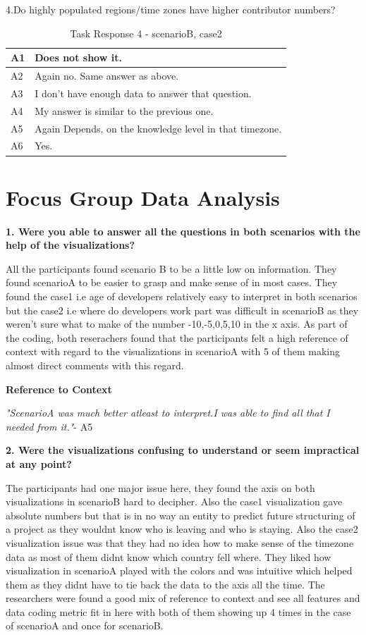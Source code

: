 \documentclass[seploa]{beavtex}
\begin{document}
4.Do highly populated regions/time zones have higher contributor numbers?

\begin{table}[H]
\begin{tabular}{ |p{2cm}|p{12cm}| }
 \hline
 A1 & Does not show it.\\
 \hline
 A2 & Again no. Same answer as above.
\\ \hline
 A3 & I don't have enough data to answer that question.\\ \hline
 A4 & My answer is similar to the previous one.\\ \hline
 A5 & Again Depends, on the knowledge level in that timezone.\\ \hline
 A6 & Yes.\\
 \hline
\end{tabular}
\caption{Task Response 4 - scenarioB, case2}
\label{tab:table34}
\end{table}


\section{Focus Group Data Analysis}
\textbf{1. Were you able to answer all the questions in both scenarios with the help of the visualizations?}

All the participants found scenario B to be a little low on information. They found scenarioA to be easier to grasp and make sense of in most cases. They found the case1 i.e age of developers relatively easy to interpret in both scenarios but the case2 i.e where do developers work part was difficult in scenarioB as they weren't sure what to make of the number -10,-5,0,5,10 in the x axis. 
As part of the coding, both reserachers found that the participants felt a high reference of context with regard to the visualizations in scenarioA with 5 of them making almost direct comments with this regard.

\textbf{Reference to Context}

{\em "ScenarioA was much better atleast to interpret.I was able to find all that I needed from it."}- A5

\textbf{2. Were the visualizations confusing to understand or seem impractical at any point?}

The participants had one major issue here, they found the axis on both visualizations in scenarioB hard to decipher. Also the case1 visualization gave absolute numbers but that is in no way an entity to predict future structuring of a project as they wouldnt know who is leaving and who is staying. Also the case2 visualization issue was that they had no idea how to make sense of the timezone data as most of them didnt know which country fell where. They liked how visualization in scenarioA played with the colors and was intuitive which helped them as they didnt have to tie back the data to the axis all the time. The researchers were found a good mix of reference to context and see all features and data coding metric fit in here with both of them showing up 4 times in the case of scenarioA and once for scenarioB.
\end{document}
